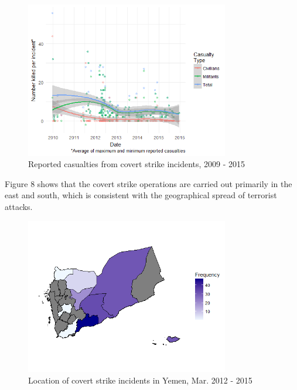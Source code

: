 \documentclass[letterpaper,12pt]{article}
\theoremstyle{definition}
\begin{document}
\begin{figure}[htb!]
\begin{center}
\caption {Reported casualties from covert strike incidents, 2009 - 2015}
  \includegraphics[width=3.5in]{strike_killed.png}
\end{center}
\end{figure}

Figure 8 shows that the covert strike operations are carried out primarily in the east and south, which is consistent with the geographical spread of terrorist attacks.

\begin{figure}[htb!]
\begin{center}
\caption {Location of covert strike incidents in Yemen, Mar. 2012 - 2015}
  \includegraphics[width=3.5in]{strike_map.png}
\end{center}
\end{figure}

\newpage
\end{document}
